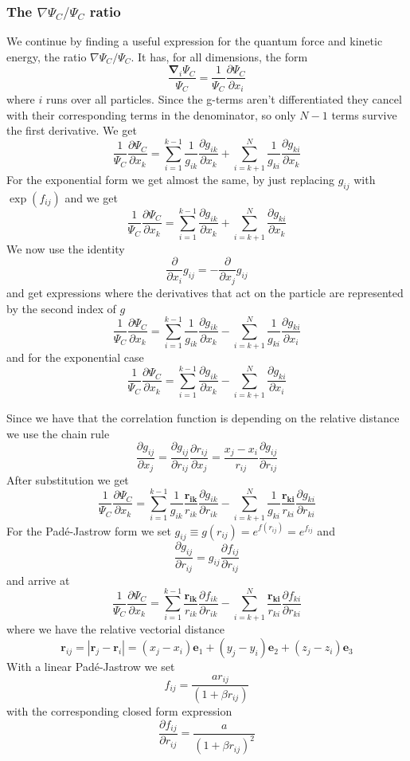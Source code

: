 \documentclass[11pt]{article}
\begin{document}
	\subsubsection{The $\nabla \Psi_{C}/\Psi_{C}$ ratio}
		We continue by finding a useful expression for the quantum force and kinetic energy, the ratio $\nabla\Psi_{C}/\Psi_{C}$. It has,
		for all dimensions, the form
		\[
		\frac{\mathbf{\nabla}_{i}\Psi_{C}}{\Psi_{C}}=\frac{1}{\Psi_{C}}\frac{\partial\Psi_{C}}{\partial x_{i}}
		\]
		where $i$ runs over all particles. Since the g-terms aren't differentiated
		they cancel with their corresponding terms in the denominator, so
		only $N-1$ terms survive the first derivative. We get
		\[
		\frac{1}{\Psi_{C}}\frac{\partial\Psi_{C}}{\partial x_{k}}=\sum_{i=1}^{k-1}\frac{1}{g_{ik}}\frac{\partial g_{ik}}{\partial x_{k}}+\sum_{i=k+1}^{N}\frac{1}{g_{ki}}\frac{\partial g_{ki}}{\partial x_{k}}
		\]
		For the exponential form we get almost the same, by just replacing
		$g_{ij}$ with $\exp\left(f_{ij}\right)$ and we get
		\[
		\frac{1}{\Psi_{C}}\frac{\partial\Psi_{C}}{\partial x_{k}}=\sum_{i=1}^{k-1}\frac{\partial g_{ik}}{\partial x_{k}}+\sum_{i=k+1}^{N}\frac{\partial g_{ki}}{\partial x_{k}}
		\]
		We now use the identity
		\[
		\frac{\partial}{\partial x_{i}}g_{ij}=-\frac{\partial}{\partial x_{j}}g_{ij}
		\]
		and get expressions where the derivatives that act on the particle
		are represented by the second index of $g$
		\[
		\frac{1}{\Psi_{C}}\frac{\partial\Psi_{C}}{\partial x_{k}}=\sum_{i=1}^{k-1}\frac{1}{g_{ik}}\frac{\partial g_{ik}}{\partial x_{k}}-\sum_{i=k+1}^{N}\frac{1}{g_{ki}}\frac{\partial g_{ki}}{\partial x_{i}}
		\]
		and for the exponential case
		\[
		\frac{1}{\Psi_{C}}\frac{\partial\Psi_{C}}{\partial x_{k}}=\sum_{i=1}^{k-1}\frac{\partial g_{ik}}{\partial x_{k}}-\sum_{i=k+1}^{N}\frac{\partial g_{ki}}{\partial x_{i}}
		\]


		Since we have that the correlation function is depending on the relative
		distance we use the chain rule
		\[
		\frac{\partial g_{ij}}{\partial x_{j}}=\frac{\partial g_{ij}}{\partial r_{ij}}\frac{\partial r_{ij}}{\partial x_{j}}=\frac{x_{j}-x_{i}}{r_{ij}}\frac{\partial g_{ij}}{\partial r_{ij}}
		\]
		 After substitution we get
		\[
		\frac{1}{\Psi_{C}}\frac{\partial\Psi_{C}}{\partial x_{k}}=\sum_{i=1}^{k-1}\frac{1}{g_{ik}}\frac{\mathbf{r_{ik}}}{r_{ik}}\frac{\partial g_{ik}}{\partial r_{ik}}-\sum_{i=k+1}^{N}\frac{1}{g_{ki}}\frac{\mathbf{r_{ki}}}{r_{ki}}\frac{\partial g_{ki}}{\partial r_{ki}}
		\]
		For the Padé-Jastrow form we set $\ensuremath{g_{ij}\equiv g(r_{ij})=e^{f(r_{ij})}=e^{f_{ij}}}$
		and 
		\[
		\frac{\partial g_{ij}}{\partial r_{ij}}=g_{ij}\frac{\partial f_{ij}}{\partial r_{ij}}
		\]
		and arrive at 
		\[
		\frac{1}{\Psi_{C}}\frac{\partial\Psi_{C}}{\partial x_{k}}=\sum_{i=1}^{k-1}\frac{\mathbf{r_{ik}}}{r_{ik}}\frac{\partial f_{ik}}{\partial r_{ik}}-\sum_{i=k+1}^{N}\frac{\mathbf{r_{ki}}}{r_{ki}}\frac{\partial f_{ki}}{\partial r_{ki}}
		\]
		where we have the relative vectorial distance 
		\[
		\mathbf{r}_{ij}=|\mathbf{r}_{j}-\mathbf{r}_{i}|=(x_{j}-x_{i})\mathbf{e}_{1}+(y_{j}-y_{i})\mathbf{e}_{2}+(z_{j}-z_{i})\mathbf{e}_{3}
		\]
		With a linear Padé-Jastrow we set
		\[
		f_{ij}=\frac{ar_{ij}}{(1+\beta r_{ij})}
		\]
		with the corresponding closed form expression
		\[
		\frac{\partial f_{ij}}{\partial r_{ij}}=\frac{a}{(1+\beta r_{ij})^{2}}
		\]
\end{document}
